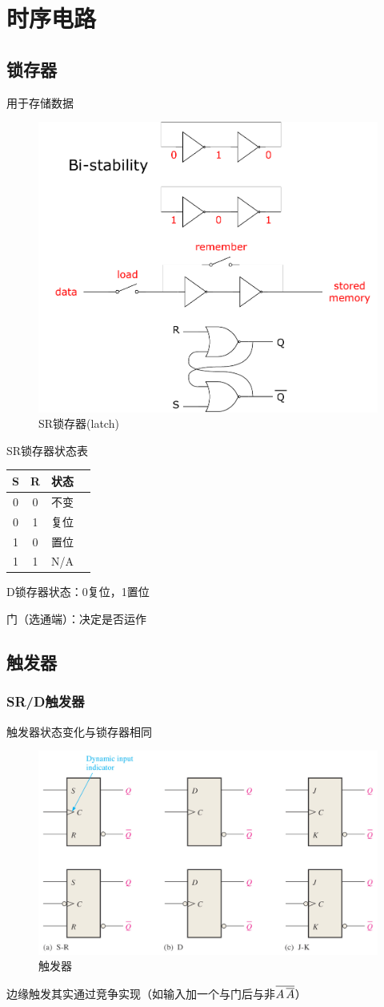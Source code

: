 \section{时序电路}
\subsection{锁存器}
\par 用于存储数据
\begin{figure}[htbp]
	\centering
	\includegraphics[width=0.6\linewidth]{fig/latches.pdf}
	\caption{SR锁存器(latch)}
\end{figure}
\par SR锁存器状态表
\begin{center}
\begin{tabular}{|c|c|c|c|}
\hline
S & R & 状态\\\hline
0 & 0 & 不变\\\hline
0 & 1 & 复位\\\hline
1 & 0 & 置位\\\hline
1 & 1 & N/A\\\hline
\end{tabular}
\end{center}
\par D锁存器状态：0复位，1置位
\par 门（选通端）：决定是否运作

\subsection{触发器}
\subsubsection{SR/D触发器}
\par 触发器状态变化与锁存器相同
\begin{figure}[htbp]
	\centering
	\includegraphics[width=0.6\linewidth]{fig/flip-flops.png}
	\caption{触发器}
\end{figure}
边缘触发其实通过竞争实现（如输入加一个与门后与非$\mathop{\overline{A\mathop{\overline{A}}}}$）

